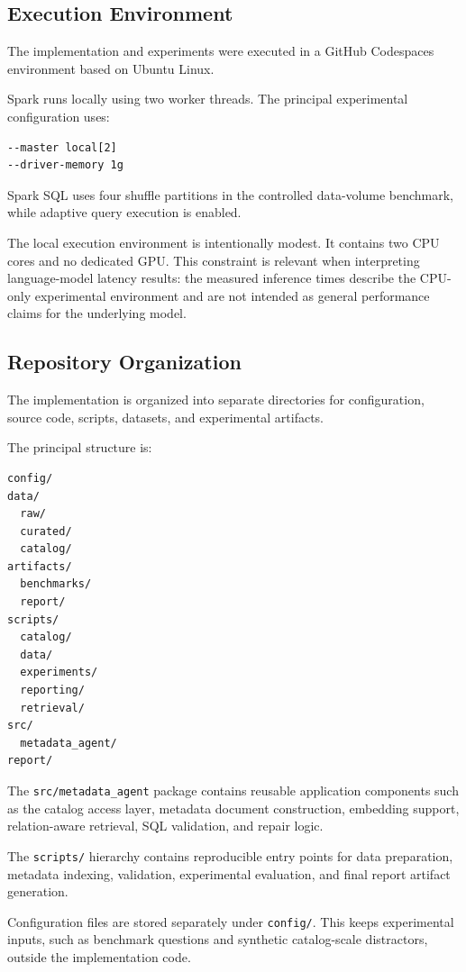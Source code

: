 \subsection{Execution Environment}

The implementation and experiments were executed in a GitHub Codespaces
environment based on Ubuntu Linux.

Spark runs locally using two worker threads. The principal experimental
configuration uses:

\begin{verbatim}
--master local[2]
--driver-memory 1g
\end{verbatim}

Spark SQL uses four shuffle partitions in the controlled data-volume
benchmark, while adaptive query execution is enabled.

The local execution environment is intentionally modest. It contains two CPU
cores and no dedicated GPU. This constraint is relevant when interpreting
language-model latency results: the measured inference times describe the
CPU-only experimental environment and are not intended as general performance
claims for the underlying model.


\subsection{Repository Organization}

The implementation is organized into separate directories for configuration,
source code, scripts, datasets, and experimental artifacts.

The principal structure is:

\begin{verbatim}
config/
data/
  raw/
  curated/
  catalog/
artifacts/
  benchmarks/
  report/
scripts/
  catalog/
  data/
  experiments/
  reporting/
  retrieval/
src/
  metadata_agent/
report/
\end{verbatim}

The \texttt{src/metadata\_agent} package contains reusable application
components such as the catalog access layer, metadata document construction,
embedding support, relation-aware retrieval, SQL validation, and repair
logic.

The \texttt{scripts/} hierarchy contains reproducible entry points for data
preparation, metadata indexing, validation, experimental evaluation, and
final report artifact generation.

Configuration files are stored separately under \texttt{config/}. This keeps
experimental inputs, such as benchmark questions and synthetic catalog-scale
distractors, outside the implementation code.


